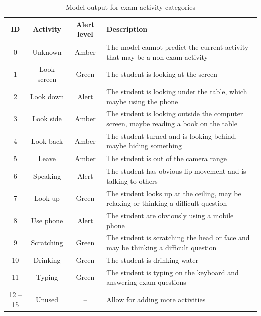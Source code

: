 \begin{table}[!ht]
\renewcommand{\arraystretch}{1}
\newcommand{\green}{\color{caribbeangreen} Green}
\newcommand{\amber}{\color{amber} Amber}
\newcommand{\red}{\color{carminered} Alert}
\begin{tabularx}{\textwidth}{|c|c|c|X|}
\hline
ID & Activity    & Alert level & Description \\ \hline
0           & Unknown     & \amber & The model cannot predict the current activity that may be a non-exam activity \\ \hline
1           & Look screen & \green & The student is looking at the screen \\ \hline
2           & Look down   & \red   & The student is looking under the table, which maybe using the phone \\ \hline
3           & Look side   & \amber & The student is looking outside the computer screen, maybe reading a book on the table \\ \hline
4           & Look back   & \amber & The student turned and is looking behind, maybe hiding something \\ \hline
5           & Leave       & \amber & The student is out of the camera range \\ \hline
6           & Speaking    & \red   & The student has obvious lip movement and is talking to others \\ \hline
7           & Look up     & \green & The student looks up at the ceiling, may be relaxing or thinking a difficult question \\ \hline
8           & Use phone   & \red   & The student are obviously using a mobile phone \\ \hline
9           & Scratching  & \green & The student is scratching the head or face and may be thinking a difficult question \\ \hline
10          & Drinking    & \green & The student is drinking water \\ \hline
11          & Typing      & \green & The student is typing on the keyboard and answering exam questions \\ \hline
12 -- 15    & Unused      & --     & Allow for adding more activities \\ \hline
\end{tabularx}
\caption{Model output for exam activity categories}
\label{tab:Model output}
\end{table}
